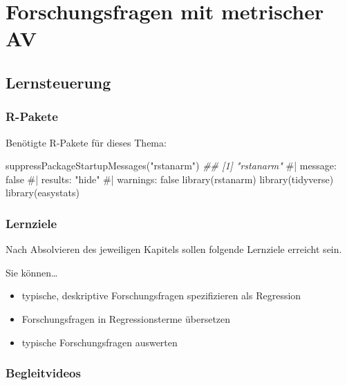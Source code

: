 \documentclass[
  a4paper,
  DIV=11]{scrreprt}
\newenvironment{Shaded}{\begin{snugshade}}{\end{snugshade}}
\newcommand{\CommentTok}[1]{\textcolor[rgb]{0.37,0.37,0.37}{#1}}
\newcommand{\DocumentationTok}[1]{\textcolor[rgb]{0.37,0.37,0.37}{\textit{#1}}}
\newcommand{\FunctionTok}[1]{\textcolor[rgb]{0.28,0.35,0.67}{#1}}
\newcommand{\NormalTok}[1]{\textcolor[rgb]{0.00,0.23,0.31}{#1}}
\newcommand{\StringTok}[1]{\textcolor[rgb]{0.13,0.47,0.30}{#1}}
\providecommand{\tightlist}{%
  \setlength{\itemsep}{0pt}\setlength{\parskip}{0pt}}\usepackage{longtable,booktabs,array}
\theoremstyle{definition}
\theoremstyle{remark}
\begin{document}

\hypertarget{forschungsfragen-mit-metrischer-av}{%
\chapter{Forschungsfragen mit metrischer
AV}\label{forschungsfragen-mit-metrischer-av}}

\hypertarget{lernsteuerung-8}{%
\section{Lernsteuerung}\label{lernsteuerung-8}}

\hypertarget{r-pakete}{%
\subsection{R-Pakete}\label{r-pakete}}

Benötigte R-Pakete für dieses Thema:

\begin{Shaded}
\begin{Highlighting}[]
\FunctionTok{suppressPackageStartupMessages}\NormalTok{(}\StringTok{"rstanarm"}\NormalTok{)}
\DocumentationTok{\#\# [1] "rstanarm"}
\CommentTok{\#| message: false}
\CommentTok{\#| results: "hide"}
\CommentTok{\#| warnings: false}
\FunctionTok{library}\NormalTok{(rstanarm)}
\FunctionTok{library}\NormalTok{(tidyverse)}
\FunctionTok{library}\NormalTok{(easystats)}
\end{Highlighting}
\end{Shaded}

\hypertarget{lernziele-9}{%
\subsection{Lernziele}\label{lernziele-9}}

Nach Absolvieren des jeweiligen Kapitels sollen folgende Lernziele
erreicht sein.

Sie können\ldots{}

\begin{itemize}
\tightlist
\item
  typische, deskriptive Forschungsfragen spezifizieren als Regression
\item
  Forschungsfragen in Regressionsterme übersetzen
\item
  typische Forschungsfragen auswerten
\end{itemize}

\hypertarget{begleitvideos-6}{%
\subsection{Begleitvideos}\label{begleitvideos-6}}
\end{document}
